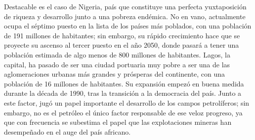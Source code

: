 \vspace{-0.2cm}
Destacable es el caso de Nigeria, pa\'is que constituye una perfecta yuxtaposici\'on de riqueza y desarrollo junto a una pobreza end\'emica. No en vano, actualmente ocupa el s\'eptimo puesto en la lista de los pa\'ises m\'as poblados, con una poblaci\'on de 191 millones de habitantes; sin embargo, su r\'apido crecimiento hace que se proyecte su ascenso al tercer puesto en el a\~no 2050, donde pasar\'a a tener una poblaci\'on estimada de algo menos de 800 millones de habitantes. Lagos, la capital, ha pasado de ser una ciudad portuaria muy pobre a ser una de las aglomeraciones urbanas m\'as grandes y pr\'osperas del continente, con una poblaci\'on de 16 millones de habitantes. Su expansi\'on empez\'o en buena medida durante la d\'ecada de 1990, tras la transici\'on a la democracia del pa\'is. Junto a este factor, jug\'o un papel importante el desarrollo de los campos petrol\'iferos; sin embargo, no es el petr\'oleo el \'unico factor responsable de ese veloz progreso, ya que con frecuencia se subestima el papel que las explotaciones mineras han desempe\~nado en el auge del pa\'is africano.

